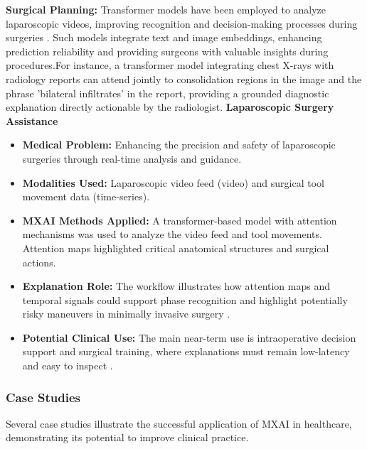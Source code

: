 \documentclass[pdflatex,sn-mathphys-num]{sn-jnl}%
\theoremstyle{thmstyleone}%
\theoremstyle{thmstyletwo}%
\theoremstyle{thmstylethree}%
\begin{document}
\begin{itemize}
     \textbf{Surgical Planning:} Transformer models have been employed to analyze laparoscopic videos, improving recognition and decision-making processes during surgeries \cite{rodis2024multimodalexplainableartificialintelligence}. Such models integrate text and image embeddings, enhancing prediction reliability and providing surgeons with valuable insights during procedures.For instance, a transformer model integrating chest X-rays with radiology reports can attend jointly to consolidation regions in the image and the phrase 'bilateral infiltrates' in the report, providing a grounded diagnostic explanation directly actionable by the radiologist.
    \textbf{Laparoscopic Surgery Assistance}
    \begin{itemize}
        \item \textbf{Medical Problem:} Enhancing the precision and safety of laparoscopic surgeries through real-time analysis and guidance.
        \item \textbf{Modalities Used:} Laparoscopic video feed (video) and surgical tool movement data (time-series).
        \item \textbf{MXAI Methods Applied:} A transformer-based model with attention mechanisms was used to analyze the video feed and tool movements. Attention maps highlighted critical anatomical structures and surgical actions.
        \item \textbf{Explanation Role:} The workflow illustrates how attention maps and temporal signals could support phase recognition and highlight potentially risky maneuvers in minimally invasive surgery \cite{SADEGHI2024109370}.
        \item \textbf{Potential Clinical Use:} The main near-term use is intraoperative decision support and surgical training, where explanations must remain low-latency and easy to inspect  \cite{SADEGHI2024109370}.
    \end{itemize}



\subsubsection{Case Studies}

Several case studies illustrate the successful application of MXAI in healthcare, demonstrating its potential to improve clinical practice.


\end{itemize}
\end{document}
